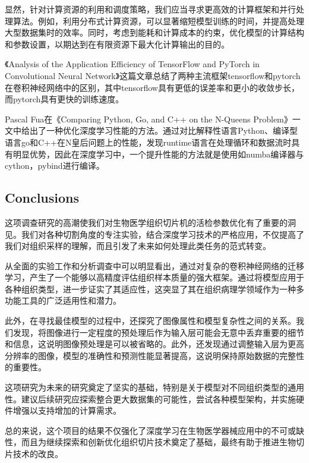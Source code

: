 显然，针对计算资源的利用和调度策略，我们应当寻求更高效的计算框架和并行处理算法。例如，利用分布式计算资源，可以显著缩短模型训练的时间，并提高处理大型数据集时的效率。同时，考虑到能耗和计算成本的约束，优化模型的计算结构和参数设置，以期达到在有限资源下最大化计算输出的目的。

《Analysis of the Application Efficiency of TensorFlow and PyTorch in Convolutional Neural Network》这篇文章总结了两种主流框架tensorflow和pytorch在卷积神经网络中的区别，其中tensorflow具有更低的误差率和更小的收敛步长，而pytorch具有更快的训练速度\cite{6.2}。




Pascal Fua在《Comparing Python, Go, and C++ on the N-Queens Problem》一文中给出了一种优化深度学习性能的方法。通过对比解释性语言Python、编译型语言go和C++在N皇后问题上的性能，发现runtime语言在处理循环和数据流时具有明显优势，因此在深度学习中，一个提升性能的方法就是使用如numba编译器与cython，pybind进行编译\cite{6.3}。




\subsection{Conclusions}

这项调查研究的高潮使我们对生物医学组织切片机的活检参数优化有了重要的洞见。我们对各种切割角度的专注实验，结合深度学习技术的严格应用，不仅提高了我们对组织采样的理解，而且引发了未来如何处理此类任务的范式转变。

从全面的实验工作和分析调查中可以明显看出，通过对复杂的卷积神经网络的迁移学习，产生了一个能够以高精度评估组织样本质量的强大框架。通过将模型应用于各种组织类型，进一步证实了其适应性，这突显了其在组织病理学领域作为一种多功能工具的广泛适用性和潜力。

此外，在寻找最佳模型的过程中，还探究了图像属性和模型复杂性之间的关系。我们发现，将图像进行一定程度的预处理后作为输入层可能会无意中丢弃重要的细节和信息，这说明图像预处理是可以被省略的。此外，还发现通过调整输入层为更高分辨率的图像，模型的准确性和预测性能显著提高，这说明保持原始数据的完整性的重要性。

这项研究为未来的研究奠定了坚实的基础，特别是关于模型对不同组织类型的通用性。建议后续研究应探索整合更大数据集的可能性，尝试各种模型架构，并实施硬件增强以支持增加的计算需求。

总的来说，这个项目的结果不仅强化了深度学习在生物医学器械应用中的不可或缺性，而且为继续探索和创新优化组织切片技术奠定了基础，最终有助于推进生物切片技术的改良。








\FloatBarrier %